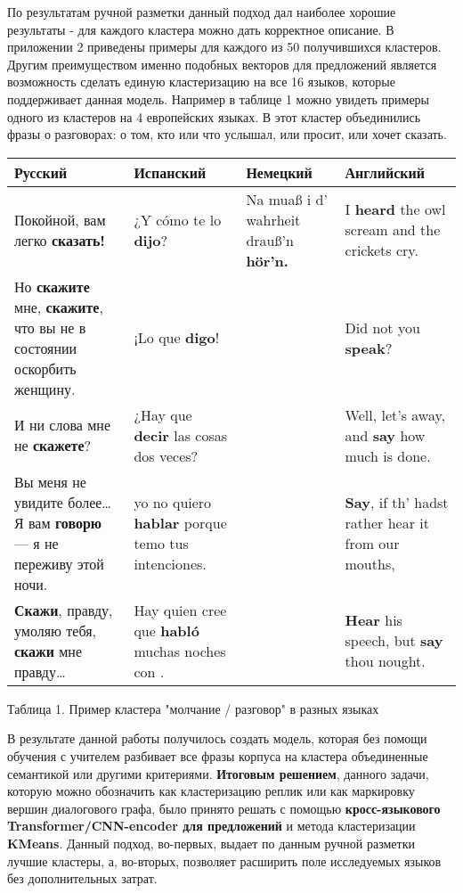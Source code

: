 \documentclass[a4paper,14pt]{article}
\begin{document}
\begin{justify}
\indent
По результатам ручной разметки данный подход дал наиболее хорошие результаты - для каждого кластера можно дать корректное описание. В приложении 2 приведены примеры для каждого из 50 получившихся кластеров. \\
\indent
Другим преимуществом именно подобных векторов для предложений является возможность сделать единую кластеризацию на все 16 языков, которые поддерживает данная модель. Например в таблице 1 можно увидеть примеры одного из кластеров на 4 европейских языках. В этот кластер объединились фразы о разговорах: о том, кто или что услышал, или просит, или хочет сказать.

\begin{center}
\begin{tabularx}{\linewidth}{ | E | E | E | E | }
\hline
Русский&Испанский&Немецкий&Английский\\ \hline
Покойной, вам легко \textbf{сказать!}&¿Y cómo te lo \textbf{dijo}?&Na muaß i d' wahrheit drauß'n \textbf{hör'n.}&I \textbf{heard} the owl scream and the crickets cry.\\ \hline
Но \textbf{скажите} мне, \textbf{скажите}, что вы не в состоянии оскорбить женщину.&¡Lo que \textbf{digo}!&&Did not you \textbf{speak}?\\ 
И ни слова мне не \textbf{скажете}?&¿Hay que \textbf{decir} las cosas dos veces?&&Well, let's away, and \textbf{say} how much is done.\\ 
Вы меня не увидите более… Я вам \textbf{говорю} — я не переживу этой ночи.&yo no quiero \textbf{hablar} porque temo tus intenciones.&&\textbf{Say}, if th' hadst rather hear it from our mouths,\\
\textbf{Скажи}, правду, умоляю тебя, \textbf{скажи} мне правду…&Hay quien cree que \textbf{habló} muchas noches con .&&\textbf{Hear} his speech, but \textbf{say} thou nought.\\
\hline
\end{tabularx}
Таблица 1. Пример кластера "молчание / разговор"  в разных языках \\
\end{center}
\indent
В результате данной работы получилось создать модель, которая без помощи обучения с учителем разбивает все фразы корпуса на кластера объединенные семантикой или другими критериями. \textbf{Итоговым решением}, данного задачи, которую можно обозначить как кластеризацию реплик или как маркировку вершин диалогового графа, было принято решать с помощью \textbf{кросс-языкового Transformer/CNN-encoder для предложений} и метода кластеризации \textbf{KMeans}. Данный подход, во-первых, выдает по данным ручной разметки лучшие кластеры, а, во-вторых, позволяет расширить поле исследуемых языков без дополнительных затрат. 
\end{justify}
\pagebreak
\end{document}
